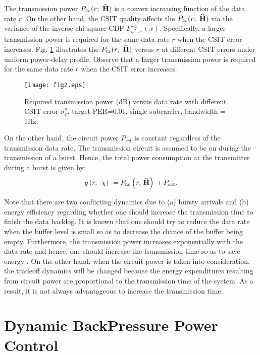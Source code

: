 \documentclass[11pt,journal, onecolumn]{./IEEEtran}
\newcommand{\black}{\color{black}}
\newcommand{\red}{\color{black}}
\begin{document}
\black

The transmission power $P_{tx}(r;\,\,\widehat{\bf{H}})$ is a convex increasing function of the data rate $r$. On the other hand, the CSIT quality affects the $P_{tx}(r;\,\,\widehat{\bf{H}})$ via the variance of the inverse chi-square CDF $F_{{\psi ^2};{s^2}}^{ - 1}(x)$. Specifically, a larger transmission power is required for the same data rate $r$ when the CSIT error increases. Fig. \ref{fig2} illustrates the $P_{tx}(r;\,\,\widehat{\bf{H}})$ versus $r$ at different CSIT errors {\red under uniform power-delay profile}. Observe that a larger transmission power is required for the same data rate $r$ when the CSIT error increases.

\begin{figure}[t!]
\centering
\texttt{[image: fig2.eps]}
\caption{Required transmission power (dB) versus data rate with different CSIT error $\sigma^2_e$, target PER=0.01, single subcarrier, bandwidth = 1Hz.} \label{fig2}
\end{figure}

On the other hand, the circuit power $P_{cct}$ is constant regardless of the transmission data rate. The transmission circuit is assumed to be on during the transmission of a burst. Hence, the total power consumption at the transmitter during a burst is given by:
\[g\left( {r,\,\,\,\chi } \right)\,\, = {P_{tx}}\left( {r,\,\widehat{\bf{H}}} \right)\, + {P_{cct}}. \]

Note that there are two conflicting dynamics due to (a) bursty arrivals and (b) energy efficiency regarding whether one should increase the transmission time to finish the data backlog. It is known \cite{berry_communication_2002} that one should try to reduce the data rate when the buffer level is small so as to decrease the chance of the buffer being empty.
Furthermore, the transmission power increases exponentially with the data rate and hence, one should increase the transmission time so as to save energy \cite{zafer_minimum_2009}. On the other hand, when the circuit power is taken into consideration, the tradeoff dynamics will be changed because the energy expenditures resulting from circuit power are proportional to the transmission time of the system\cite{shuguang_cui_energy-constrained_2005}. As a result, it is not always advantageous to increase the transmission time.




\section{Dynamic BackPressure Power Control}
\end{document}
